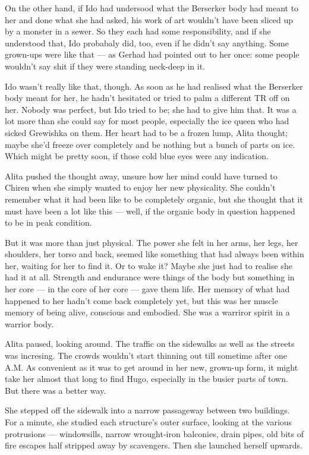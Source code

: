 \documentclass[11pt]{article}
\begin{document}
On the other hand, if Ido had undersood what the Berserker body had meant to her and done what she had asked, his work of art wouldn't have been sliced up by a monster in a sewer. So they each had some responsibility, and if she understood that, Ido probabaly did, too, even if he didn't say anything. Some grown-ups were like that --- as Gerhad had pointed out to her once: some people wouldn't say shit if they were standing neck-deep in it.

Ido wasn't really like that, though. As soon as he had realised what the Berserker body meant for her, he hadn't hesitated or tried to palm a different TR off on her. Nobody was perfect, but Ido tried to be; she had to give him that. It was a lot more than she could say for most people, especially the ice queen who had sicked Grewishka on them. Her heart had to be a frozen lump, Alita thought; maybe she'd freeze over completely and be nothing but a bunch of parts on ice. Which might be pretty soon, if those cold blue eyes were any indication.

Alita pushed the thought away, unsure how her mind could have turned to Chiren when she simply wanted to enjoy her new physicality. She couldn't remember what it had been like to be completely organic, but she thought that it must have been a lot like this --- well, if the organic body in question happened to be in peak condition.

But it was more than just physical. The power she felt in her arms, her legs, her shoulders, her torso and back, seemed like something that had always been within her, waiting for her to find it. Or to wake it? Maybe she just had to realise she had it at all. Strength and endurance were things of the body but something in her core --- in the core of her core --- gave them life. Her memory of what had happened to her hadn't come back completely yet, but this was her muscle memory of being alive, conscious and embodied. She was a warriror spirit in a warrior body.

Alita paused, looking around. The traffic on the sidewalks as well as the streets was incresing. The crowds wouldn't start thinning out till sometime after one A.M. As convenient as it was to get around in her new, grown-up form, it might take her almost that long to find Hugo, especially in the busier parts of town. But there was a better way.

She stepped off the sidewalk into a narrow passageway between two buildings. For a minute, she studied each structure's outer surface, looking at the various protrusions --- windowsills, narrow wrought-iron balconies, drain pipes, old bits of fire escapes half stripped away by scavengers. Then she launched herself upwards.
\end{document}
